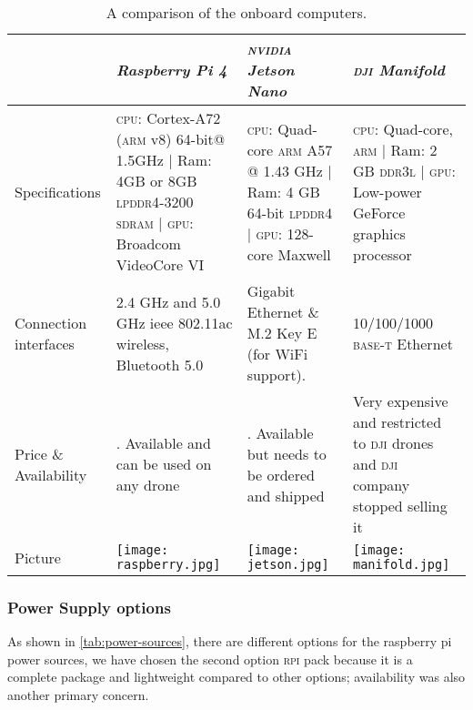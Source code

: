 \documentclass[../main.tex]{subfiles}
\begin{document}
\begin{table}[tbp]
	\centering
	\caption{A comparison of the onboard computers.}
	\label{tab:onboard-computers}  
	\begin{tabular}{ p{3cm} p{4cm} p{4cm} p{4cm} }
		\toprule
		\textit{} & \textit{Raspberry Pi 4} & \textit{\textsc{nvidia} Jetson Nano} & 
		\textit{\textsc{dji} Manifold}\\ \midrule
		Specifications  & \textsc{cpu}: Cortex-A72 (\textsc{arm} v8) 64-bit@ 1.5GHz | Ram: 4GB or 8GB \textsc{lpddr4}-3200 \textsc{sdram} | \textsc{gpu}: Broadcom VideoCore VI & 
		\textsc{cpu}: Quad-core \textsc{arm} A57 @ 1.43 GHz | Ram: 4 GB 64-bit 
		\textsc{lpddr4}   | \textsc{gpu}: 128-core Maxwell & \textsc{cpu}: Quad-core, 
		\textsc{arm} | Ram: 2 GB \textsc{ddr3l} | \textsc{gpu}: Low-power GeForce
		 graphics processor \\ \addlinespace
		Connection interfaces & 2.4 GHz and 5.0 GHz \gls{ieee} 802.11ac wireless,
		 Bluetooth 5.0 & Gigabit Ethernet \& M.2 Key E (for WiFi support). &10/100/1000 
		 \textsc{base-t} Ethernet \\ \addlinespace
		
		Price \& Availability & \qar{300}. Available and can be used on any drone & 
		\qar{400}. Available but needs to be ordered and shipped & Very expensive 
		and restricted to \textsc{dji} drones and \textsc{dji} company stopped 
		selling it \\ \addlinespace
		Picture & \begin{minipage}{.2\textwidth}
			\texttt{[image: raspberry.jpg]}
		\end{minipage}  & \begin{minipage}{.2\textwidth}
			\texttt{[image: jetson.jpg]}
		\end{minipage} & \begin{minipage}{.2\textwidth}
			\texttt{[image: manifold.jpg]}
		\end{minipage} \\
		\bottomrule
	\end{tabular}
\end{table}

\subsubsection{Power Supply options}

As shown in \cref{tab:power-sources}, there are different options for
the raspberry pi power sources, we have chosen the second option
\textsc{rpi} pack because it is a complete package and lightweight compared 
to other options; availability was also another primary concern. 
\end{document}
